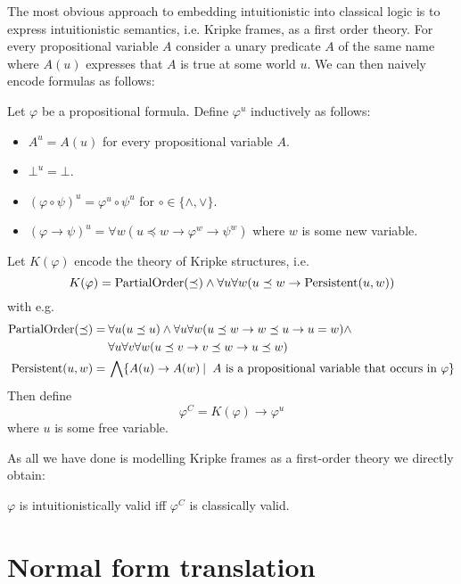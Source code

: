 \documentclass[a4paper,UKenglish,cleveref, autoref, thm-restate]{lipics-v2021}
\begin{document}
The most obvious approach to embedding intuitionistic into classical logic is to express intuitionistic semantics, i.e. Kripke frames, as a first order theory. For every propositional variable $A$ consider a unary predicate $A$ of the same name where $A(u)$ expresses that $A$ is true at some world $u$. We can then naively encode formulas as follows:

\begin{definition}
	Let $\varphi$ be a propositional formula. Define $\varphi^{u}$ inductively as follows:
	\begin{itemize}
		\item $A^{u} = A(u)$ for every propositional variable $A$.
		\item $\bot^u = \bot$.
		\item $(\varphi\circ\psi)^u = \varphi^u\circ\psi^u$ for $\circ\in\{\wedge, \vee\}$.
		\item $(\varphi\to \psi)^u = \forall w(u\preceq w\to\varphi^{w}\to\psi^{w})$ where $w$ is some new variable.
	\end{itemize}
	Let $K(\varphi)$ encode the theory of Kripke structures, i.e.
	$$K(\varphi) = \text{\normalfont PartialOrder}(\preceq)\wedge\forall u\forall w(u\preceq w\to \text{\normalfont Persistent}(u, w))$$
	with e.g.
	\begin{align*}
		\text{\normalfont PartialOrder}(\preceq) =&\:\forall u(u\preceq u)\wedge\forall u\forall w(u\preceq w\to w\preceq u\to u = w)\wedge\\&\:\forall u\forall v\forall w(u\preceq v\to v\preceq w\to u\preceq w)\\
		\text{\normalfont Persistent}(u, w)=&\:\bigwedge \{A(u)\to A(w)\:|\: \text{ $A$ is a propositional variable that occurs in $\varphi$}\}
	\end{align*}
	Then define
	$$\varphi^{C} = K(\varphi)\to \varphi^{u}$$
	where $u$ is some free variable.
\end{definition}

\noindent As all we have done is modelling Kripke frames as a first-order theory we directly obtain:

\begin{lemma}
	$\varphi$ is intuitionistically valid iff $\varphi^C$ is classically valid.
\end{lemma}

\section{Normal form translation}
\label{section:tseytin}
\end{document}
